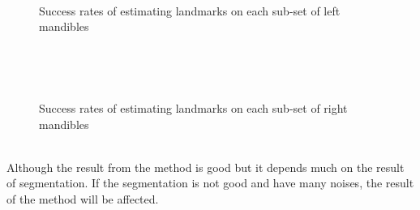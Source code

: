 \begin{figure}[h!]
\centering
{}~~
\caption{Success rates of estimating landmarks on each sub-set of left mandibles}
\label{figmg18fevr}
\end{figure}~\\
\begin{figure}[h!]
\centering
{}~~
\caption{Success rates of estimating landmarks on each sub-set of right mandibles}
\label{figmd18fevr}
\end{figure}~\\
Although the result from the method is good but it depends much on the result of segmentation. If the segmentation is not good and have many noises, the result of the method will be affected.

